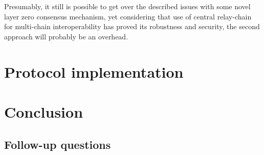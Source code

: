 \documentclass{article}
\begin{document}
Presumably, it still is possible to get over the described issues with some novel layer zero consensus mechanism, yet considering that use of central relay-chain for multi-chain interoperability has proved its robustness and security, the second approach will probably be an overhead.



\section{Protocol implementation}

\section{Conclusion}

\subsection{Follow-up questions}



\end{document}
